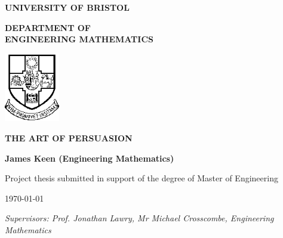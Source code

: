 \begin{titlepage}

\vspace*{1cm}

\begin{center}
    \textbf{\LARGE UNIVERSITY OF BRISTOL}
    
    \vspace{3em}
    
    \textbf{\Huge DEPARTMENT OF \\ \vspace{0.5em} ENGINEERING MATHEMATICS}
    
\end{center}
\vspace{3cm}

\center
\includegraphics[width=0.18\textwidth]{Images/Misc/bristol_emblem.png}\par\vspace{1cm}

\vspace{2.5cm}

{ \huge \bfseries THE ART OF PERSUASION
}\\

\vspace{3cm}

{ \large \bfseries James Keen (Engineering Mathematics)
}\\

\vspace{1.5cm}

{\large Project thesis submitted in support of the degree of Master of Engineering}

\vspace{0.7cm}

\today

\vspace{0.25em}


\raggedright \textit{Supervisors: Prof. Jonathan Lawry, Mr Michael Crosscombe,  Engineering Mathematics}

\end{titlepage}
